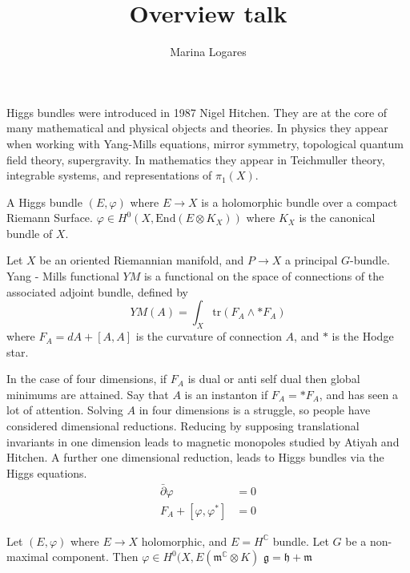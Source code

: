 % 

\title{Overview talk}
\author{Marina Logares}
\date{}

 
\maketitle

Higgs bundles were introduced in 1987 Nigel Hitchen.
They are at the core of many mathematical and physical objects and theories.
In physics they appear when working with Yang-Mills equations, mirror symmetry, topological quantum field theory, supergravity.
In mathematics they appear in Teichmuller theory, integrable systems, and representations of $ \pi_1 (X) $. 

\begin{definition}
    A Higgs bundle $(E, \varphi) $ where $ E \rightarrow  X $ is a holomorphic bundle over a compact Riemann Surface. 
    $ \varphi \in H^0 ( X, \mathrm{End} (E \otimes K _X) ) $ where $K_X$ is the canonical bundle of $X$. 
\end{definition}

Let $X$ be an oriented Riemannian manifold, and $P \rightarrow X$ a principal $G$-bundle. 
Yang - Mills functional $YM$ is a functional on the space of connections of the associated adjoint bundle, defined by
\begin{equation}
    YM(A) = \int_X \mathrm{tr}(F_A \wedge * F_A) 
\end{equation}
where $ F_A= dA + [A, A] $ is the curvature of connection $A$, and $*$ is the Hodge star. 

In the case of four dimensions, if $F_A$ is dual or anti self dual then global minimums are attained.
Say that $A$ is an instanton if $ F_A = * F_A $, and has seen a lot of attention.
Solving $A$ in four dimensions is a struggle, so people have considered dimensional reductions. 
Reducing by supposing translational invariants in one dimension leads to magnetic monopoles studied by Atiyah and Hitchen.
A further one dimensional reduction, leads to Higgs bundles via the Higgs equations. 
\begin{align}
    \bar{\partial} \varphi & = 0 \\
    F_A + [ \varphi , \varphi^* ] &= 0 
\end{align}


Let $(E,\varphi) $ where $ E \rightarrow  X$ holomorphic, 
and $ E = H^\mathbb{C} $ bundle.
Let $ G$ be a non-maximal component. 
Then $ \varphi \in H ^0 ( X, E(\mathfrak{m}^ \mathbb{C} \otimes K) $
$\mathfrak{g} = \mathfrak{h} + \mathfrak{m} $ 

